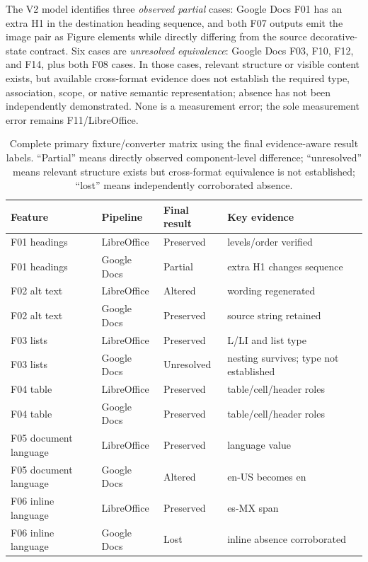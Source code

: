 The V2 model identifies three \emph{observed partial} cases: Google Docs F01 has an extra H1 in the destination heading sequence, and both F07 outputs emit the image pair as Figure elements while directly differing from the source decorative-state contract. Six cases are \emph{unresolved equivalence}: Google Docs F03, F10, F12, and F14, plus both F08 cases. In those cases, relevant structure or visible content exists, but available cross-format evidence does not establish the required type, association, scope, or native semantic representation; absence has not been independently demonstrated. None is a measurement error; the sole measurement error remains F11/LibreOffice.

\begin{table}[t]
\centering\scriptsize
\caption{Complete primary fixture/converter matrix using the final evidence-aware result labels. ``Partial'' means directly observed component-level difference; ``unresolved'' means relevant structure exists but cross-format equivalence is not established; ``lost'' means independently corroborated absence.}
\label{tab:results}
\begin{tabular}{p{}p{}p{}p{}}
\hline
Feature & Pipeline & Final result & Key evidence \\
\hline
F01 headings & LibreOffice & Preserved & levels/order verified \\
F01 headings & Google Docs & Partial & extra H1 changes sequence \\
F02 alt text & LibreOffice & Altered & wording regenerated \\
F02 alt text & Google Docs & Preserved & source string retained \\
F03 lists & LibreOffice & Preserved & L/LI and list type \\
F03 lists & Google Docs & Unresolved & nesting survives; type not established \\
F04 table & LibreOffice & Preserved & table/cell/header roles \\
F04 table & Google Docs & Preserved & table/cell/header roles \\
F05 document language & LibreOffice & Preserved & language value \\
F05 document language & Google Docs & Altered & en-US becomes en \\
F06 inline language & LibreOffice & Preserved & es-MX span \\
F06 inline language & Google Docs & Lost & inline absence corroborated \\

\end{tabular}
\end{table}
